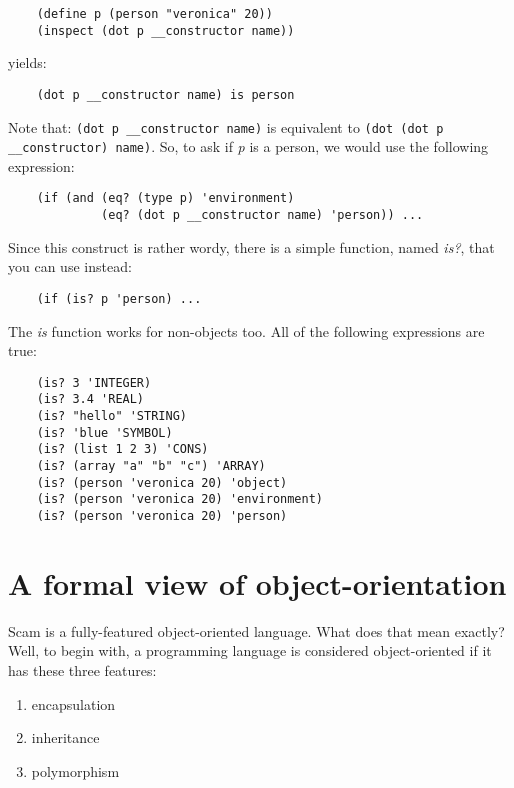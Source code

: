 \begin{verbatim}
    (define p (person "veronica" 20))
    (inspect (dot p __constructor name))
\end{verbatim}

yields:

\begin{verbatim}
    (dot p __constructor name) is person
\end{verbatim}

Note that:
\verb!(dot p __constructor name)!
is equivalent to
\verb!(dot (dot p __constructor) name)!.
So, to ask if {\it p} is a person, we would use the following
expression:

\begin{verbatim}
    (if (and (eq? (type p) 'environment)
             (eq? (dot p __constructor name) 'person)) ...
\end{verbatim}

Since this construct is rather wordy, there
is a simple function, named {\it is?}, that you can use instead:

\begin{verbatim}
    (if (is? p 'person) ...
\end{verbatim}

The {\it is} function works for non-objects too. All of the following
expressions are true:

\begin{verbatim}
    (is? 3 'INTEGER)
    (is? 3.4 'REAL)
    (is? "hello" 'STRING)
    (is? 'blue 'SYMBOL)
    (is? (list 1 2 3) 'CONS)
    (is? (array "a" "b" "c") 'ARRAY)
    (is? (person 'veronica 20) 'object)
    (is? (person 'veronica 20) 'environment)
    (is? (person 'veronica 20) 'person)
\end{verbatim}

\section{A formal view of object-orientation}

Scam is a fully-featured object-oriented language. What does
that mean exactly? Well, to begin with, a programming language
is considered object-oriented if it has these
three features:

\begin{enumerate}
\item
    encapsulation
\item
    inheritance
\item
    polymorphism
\end{enumerate}


